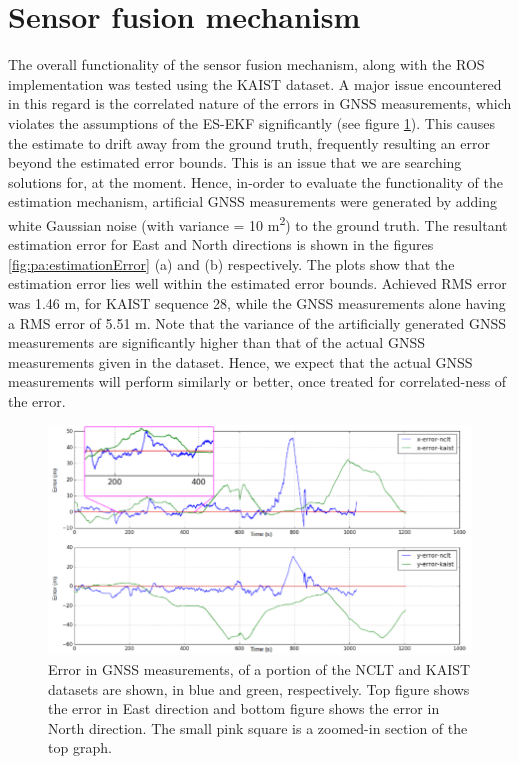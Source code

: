 \section{Sensor fusion mechanism}
The overall functionality of the sensor fusion mechanism, along with the \gls{ROS} implementation was tested using the \gls{KAIST} dataset. A major issue encountered in this regard is the correlated nature of the errors in \gls{GNSS} measurements, which violates the assumptions of the \gls{ES-EKF} significantly (see figure \ref{fig:pa:colouredGNSS}). This causes the estimate to drift away from the ground truth, frequently resulting an error beyond the estimated error bounds. This is an issue that we are searching solutions for, at the moment. Hence, in-order to evaluate the functionality of the estimation mechanism, artificial \gls{GNSS} measurements were generated by adding white Gaussian noise (with variance = 10 m\textsuperscript{2}) to the ground truth. The resultant estimation error for East and North directions is shown in the figures \ref{fig:pa:estimationError} (a) and (b) respectively. The plots show that the estimation error lies well within the estimated error bounds. Achieved \gls{RMS} error was 1.46 m, for \gls{KAIST} sequence 28, while the \gls{GNSS} measurements alone having a \gls{RMS} error of 5.51 m. Note that the variance of the artificially generated \gls{GNSS} measurements are significantly higher than that of the actual \gls{GNSS} measurements given in the dataset. Hence, we expect that the actual \gls{GNSS} measurements will perform similarly or better, once treated for correlated-ness of the error.
\begin{figure}[h]
	\centering
	\includegraphics[width=\textwidth]{figs/coloured_gnss.png}
	\vspace{-0.5cm}
	\caption[Nature of \gls{GNSS} errors]{Error in \gls{GNSS} measurements, of a portion of the \gls{NCLT} and \gls{KAIST} datasets are shown, in blue and green, respectively. Top figure shows the error in East direction and bottom figure shows the error in North direction. The small pink square is a zoomed-in section of the top graph.}
	\label{fig:pa:colouredGNSS}
	\vspace{0.5cm}
\end{figure}
